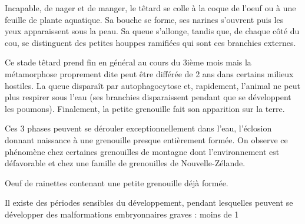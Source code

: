         Incapable, de nager et de manger, le têtard se colle à la coque de l’oeuf ou à une feuille de plante aquatique. Sa bouche se forme, ses narines s’ouvrent puis les yeux apparaissent sous la peau. Sa queue s’allonge, tandis que, de chaque côté du cou, se distinguent des petites houppes ramifiées qui sont ces branchies externes.

        Ce stade têtard prend fin en général au cours du 3ième mois mais la métamorphose proprement dite peut être différée de 2 ans dans certains milieux hostiles. La queue disparaît par autophagocytose et, rapidement, l’animal ne peut plus respirer sous l’eau (ses branchies disparaissent pendant que se développent les poumons). Finalement, la petite grenouille fait son apparition sur la terre.

        Ces 3 phases peuvent se dérouler exceptionnellement dans l’eau, l’éclosion donnant naissance à une grenouille presque entièrement formée. On observe ce phénomène chez certaines grenouilles de montagne dont l’environnement est défavorable et chez une famille de grenouilles de Nouvelle-Zélande.
        	

Oeuf de rainettes contenant une petite grenouille déjà formée.

        Il existe des périodes sensibles du développement, pendant lesquelles peuvent se développer des malformations embryonnaires graves : moins de 1 %